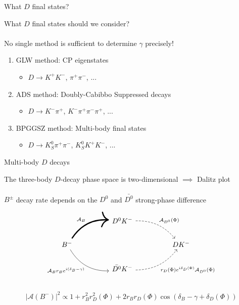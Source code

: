 \documentclass[dvipsnames]{beamer}
\begin{document}
\begin{frame}{What $D$ final states?}
  \begin{center}
    \Large What $D$ final states should we consider?\\~\\
    \Large No single method is sufficient to determine $\gamma$ precisely!
  \end{center}
  \vspace{0.2cm}
  \begin{enumerate}
    \setlength\itemsep{1.0em}
    \item{GLW method: CP eigenstates}
    \begin{itemize}
      \item{$D\to K^+K^-$, $\pi^+\pi^-$, ...}
    \end{itemize}
    \item{ADS method: Doubly-Cabibbo Suppressed decays}
    \begin{itemize}
      \item{$D\to K^-\pi^+$, $K^-\pi^+\pi^-\pi^+$, ...}
    \end{itemize}
    \item{BPGGSZ method: Multi-body final states}
    \begin{itemize}
      \item{$D\to K_S^0\pi^+\pi^-$, $K_S^0K^+K^-$, ...}
    \end{itemize}
  \end{enumerate}
\end{frame}

\begin{frame}[fragile]{Multi-body $D$ decays}
  \begin{center}
    The three-body $D$-decay phase space is two-dimensional $\implies$ Dalitz plot\\~\\
    $B^\pm$ decay rate depends on the $D^0$ and $\bar{D^0}$ strong-phase difference
  \end{center}
  \begin{equation*}
    \begin{tikzcd}[column sep=huge]
      & D^0K^- \arrow[dr, bend left = 25, dashed, "\mathcal{A}_{D^0}(\Phi)"] & \\
      B^- \arrow[ur, bend left, line width = 1.7, "\mathcal{A}_B"] \arrow[dr, bend right, "\mathcal{A}_B r_B e^{i(\delta_B - \gamma)}"'] & [5cm] & DK^- \\
      & \bar{D^0}K^- \arrow[ur, bend right = 25, dashed, "r_D(\Phi)e^{i\delta_D(\Phi)}\mathcal{A}_{D^0}(\Phi)"'] & \\
    \end{tikzcd}
  \end{equation*}
  \vspace{-0.5cm}
  \begin{equation*}
    \lvert\mathcal{A}(B^-)\lvert^2\propto1 + r_B^2r_D^2(\Phi) + 2r_Br_D(\Phi)\cos(\delta_B - \gamma + \delta_D(\Phi))
  \end{equation*}
\end{frame}
\end{document}
